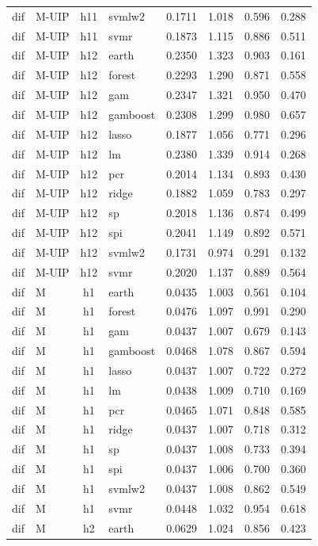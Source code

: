 \begin{ThreePartTable}
\begin{longtable}[t]{llclcccc}
dif & M-UIP & h11 & svmlw2 & 0.1711 & 1.018 & 0.596 & 0.288\\
dif & M-UIP & h11 & svmr & 0.1873 & 1.115 & 0.886 & 0.511\\
\addlinespace
dif & M-UIP & h12 & earth & 0.2350 & 1.323 & 0.903 & 0.161\\
dif & M-UIP & h12 & forest & 0.2293 & 1.290 & 0.871 & 0.558\\
dif & M-UIP & h12 & gam & 0.2347 & 1.321 & 0.950 & 0.470\\
dif & M-UIP & h12 & gamboost & 0.2308 & 1.299 & 0.980 & 0.657\\
dif & M-UIP & h12 & lasso & 0.1877 & 1.056 & 0.771 & 0.296\\
dif & M-UIP & h12 & lm & 0.2380 & 1.339 & 0.914 & 0.268\\
dif & M-UIP & h12 & pcr & 0.2014 & 1.134 & 0.893 & 0.430\\
dif & M-UIP & h12 & ridge & 0.1882 & 1.059 & 0.783 & 0.297\\
dif & M-UIP & h12 & sp & 0.2018 & 1.136 & 0.874 & 0.499\\
dif & M-UIP & h12 & spi & 0.2041 & 1.149 & 0.892 & 0.571\\
dif & M-UIP & h12 & svmlw2 & 0.1731 & 0.974 & 0.291 & 0.132\\
dif & M-UIP & h12 & svmr & 0.2020 & 1.137 & 0.889 & 0.564\\
\addlinespace
dif & M & h1 & earth & 0.0435 & 1.003 & 0.561 & 0.104\\
dif & M & h1 & forest & 0.0476 & 1.097 & 0.991 & 0.290\\
dif & M & h1 & gam & 0.0437 & 1.007 & 0.679 & 0.143\\
dif & M & h1 & gamboost & 0.0468 & 1.078 & 0.867 & 0.594\\
dif & M & h1 & lasso & 0.0437 & 1.007 & 0.722 & 0.272\\
dif & M & h1 & lm & 0.0438 & 1.009 & 0.710 & 0.169\\
dif & M & h1 & pcr & 0.0465 & 1.071 & 0.848 & 0.585\\
dif & M & h1 & ridge & 0.0437 & 1.007 & 0.718 & 0.312\\
dif & M & h1 & sp & 0.0437 & 1.008 & 0.733 & 0.394\\
dif & M & h1 & spi & 0.0437 & 1.006 & 0.700 & 0.360\\
dif & M & h1 & svmlw2 & 0.0437 & 1.008 & 0.862 & 0.549\\
dif & M & h1 & svmr & 0.0448 & 1.032 & 0.954 & 0.618\\
\addlinespace
dif & M & h2 & earth & 0.0629 & 1.024 & 0.856 & 0.423\\

\end{longtable}
\end{ThreePartTable}
